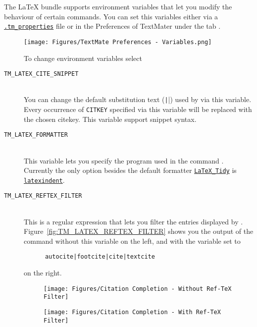 \documentclass[11pt, x11names]{article}
\begin{document}
The LaTeX bundle supports environment variables that let you modify the behaviour of certain commands. You can set this variables either via a \href{http://blog.macromates.com/2011/git-style-configuration}{\texttt{.tm\_properties}} file or in the Preferences of TextMater under the tab .

\begin{figure}[h]
  \centering
    \texttt{[image: Figures/TextMate Preferences - Variables.png]}
  \caption{To change environment variables select }
  \label{fig:Figures_TextMate_Preferences_-_Variables}
\end{figure}

\begin{description}

  \item[\texttt{TM\_LATEX\_CITE\_SNIPPET}]~\\

  You can change the default substitution text (\texttt|\cite{CITEKEY}|) used by  via this variable. Every occurrence of \texttt{CITKEY} specified via this variable will be replaced with the chosen citekey. This variable support snippet syntax.

  \item[\texttt{TM\_LATEX\_FORMATTER}]~\\

  This variable lets you specify the program used in the command . Currently the only option besides the default formatter \href{http://bfc.sfsu.edu/cgi-bin/hsu.pl?LaTeX_Tidy}{\texttt{LaTeX\_Tidy}} is \href{https://github.com/cmhughes/latexindent.pl}{\texttt{latexindent}}.

  \item[\texttt{TM\_LATEX\_REFTEX\_FILTER}]~\\

  This is a regular expression that lets you filter the entries displayed by . Figure~\ref{fig:TM_LATEX_REFTEX_FILTER} shows you the output of the command without this variable on the left, and with the variable set to

  \begin{verbatim}
      autocite|footcite|cite|textcite
  \end{verbatim}

  on the right.

  \begin{figure}[htbp]
    \begin{minipage}[t]{0.5\textwidth}
      \vspace{0cm}
      \centering
        \texttt{[image: Figures/Citation Completion - Without Ref-TeX Filter]}
    \end{minipage}
    \begin{minipage}[t]{0.5\textwidth}
      \vspace{0cm}
      \centering
        \texttt{[image: Figures/Citation Completion - With Ref-TeX Filter]}
    \end{minipage}


\end{figure}
\end{description}
\end{document}
